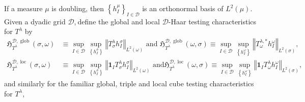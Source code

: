 \documentclass{amsart}%
\theoremstyle{plain}
\numberwithin{equation}{section}
\begin{document}
If a measure $\mu$ is doubling, then $\left\{  h_{I}^{\mu}\right\}
_{I\in\mathcal{D}}$ is an orthonormal basis of $L^{2}\left(  \mu\right)  $.
Given a dyadic grid $\mathcal{D}$,$\ $define the global and local
$\mathcal{D}$-Haar testing characteristics for $T^{\lambda}$ by%
\begin{align*}
\mathfrak{H}_{T^{\lambda}}^{\mathcal{D},\operatorname*{glob}}\left(
\sigma,\omega\right)   &  \equiv\sup_{I\in\mathcal{D}} \sup\limits_{ \left\{
h_{I}^{\sigma}\right\}  } \left\Vert T_{\sigma}^{\lambda}h_{I}^{\sigma
}\right\Vert _{L^{2}\left(  \omega\right)  }\text{ and }\mathfrak{H}%
_{T^{\lambda}}^{\mathcal{D},\operatorname*{glob}}\left(  \omega,\sigma\right)
\equiv\sup_{I\in\mathcal{D}} \sup\limits_{\left\{  h_{I}^{\omega}\right\}
}\left\Vert T_{\omega}^{\lambda,\ast}h_{I}^{\omega}\right\Vert _{L^{2}\left(
\sigma\right)  },\\
\mathfrak{H}_{T^{\lambda}}^{\mathcal{D},\operatorname{loc}}\left(
\sigma,\omega\right)   &  \equiv\sup_{I\in\mathcal{D}} \sup\limits_{ \left\{
h_{I}^{\sigma}\right\}  }\left\Vert \mathbf{1}_{I}T_{\sigma}^{\lambda}%
h_{I}^{\sigma}\right\Vert _{L^{2}\left(  \omega\right)  }\text{ and
}\mathfrak{H}_{T^{\lambda}}^{\mathcal{D},\operatorname{loc}}\left(
\omega,\sigma\right)  \equiv\sup_{I\in\mathcal{D}} \sup\limits_{ \left\{
h_{I}^{\omega}\right\}  }\left\Vert \mathbf{1}_{I}T_{\omega}^{\lambda}%
h_{I}^{\omega}\right\Vert _{L^{2}\left(  \sigma\right)  },
\end{align*}
and similarly for the familiar global, triple and local cube testing
characteristics for $T^{\lambda}$,%
\end{document}
